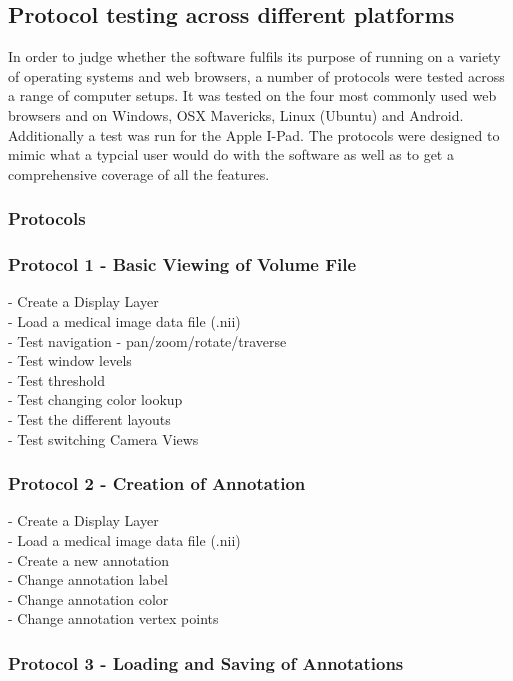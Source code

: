 \documentclass[a4paper,11pt,twoside]{article}
\begin{document}
\subsection{Protocol testing across different platforms}

In order to judge whether the software fulfils its purpose of running on a variety of operating systems and web browsers, a number of protocols were tested across a range of computer setups. It was tested on the four most commonly used web browsers and on Windows, OSX Mavericks, Linux (Ubuntu) and Android. Additionally a test was run for the Apple I-Pad. The protocols were designed to mimic what a typcial user would do with the software as well as to get a comprehensive coverage of all the features.


\subsubsection{Protocols}

\subsubsection*{Protocol 1 - Basic Viewing of Volume File }

- Create a Display Layer\\
- Load a medical image data file (.nii)\\
- Test navigation - pan/zoom/rotate/traverse\\
- Test window levels\\
- Test threshold\\
- Test changing color lookup\\
- Test the different layouts\\
- Test switching Camera Views

\subsubsection*{Protocol 2 - Creation of Annotation }

- Create a Display Layer\\
- Load a medical image data file (.nii)\\
- Create a new annotation\\
- Change annotation label\\
- Change annotation color\\
- Change annotation vertex points

\subsubsection*{Protocol 3 - Loading and Saving of Annotations }
\end{document}
